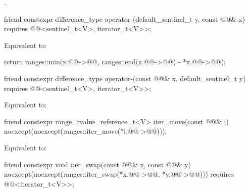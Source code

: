 \begin{itemdescr}
\pnum
\returns
{}.
\end{itemdescr}

\begin{itemdecl}
friend constexpr difference_type operator-(default_sentinel_t y, const @@& x)
  requires @@<sentinel_t<V>, iterator_t<V>>;
\end{itemdecl}

\begin{itemdescr}
\pnum
\effects
Equivalent to:
\begin{codeblock}
return ranges::min(x.@@->@@,
                   ranges::end(x.@@->@@) - *x.@@->@@);
\end{codeblock}
\end{itemdescr}

\begin{itemdecl}
friend constexpr difference_type operator-(const @@& x, default_sentinel_t y)
  requires @@<sentinel_t<V>, iterator_t<V>>;
\end{itemdecl}

\begin{itemdescr}
\pnum
\effects
Equivalent to: 
\end{itemdescr}

\begin{itemdecl}
friend constexpr range_rvalue_reference_t<V> iter_move(const @@& i)
  noexcept(noexcept(ranges::iter_move(*i.@@->@@)));
\end{itemdecl}

\begin{itemdescr}
\pnum
\effects
Equivalent to: 
\end{itemdescr}

\begin{itemdecl}
friend constexpr void iter_swap(const @@& x, const @@& y)
  noexcept(noexcept(ranges::iter_swap(*x.@@->@@, *y.@@->@@)))
  requires @@<iterator_t<V>>;
\end{itemdecl}

